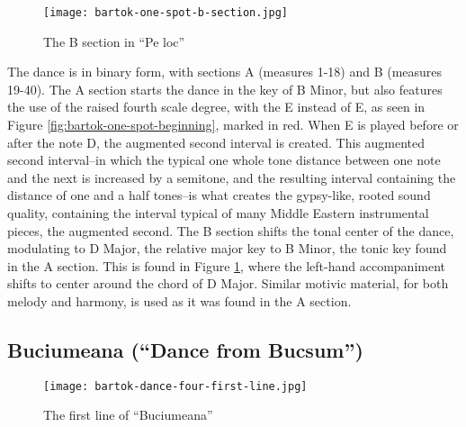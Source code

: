 \begin{figure}
  \centering
  \texttt{[image: bartok-one-spot-b-section.jpg]}
  \caption[The B section of ``Pe loc'', of Bartok's \textit{Romanian Folk Dances, Sz. 56, BB 68}]{The B section in ``Pe loc''}
  \label{fig:bartok-one-spot-b-section}
\end{figure}

The dance is in binary form, with sections A (measures 1-18) and B (measures 19-40). The A section starts the dance in the key of B Minor, but also features the use of the raised fourth scale degree, with the E\musSharp{} instead of E, as seen in Figure \ref{fig:bartok-one-spot-beginning}\autocite{Lung_2016}, marked in red. When E\musSharp{} is played before or after the note D, the augmented second interval is created. This augmented second interval--in which the typical one whole tone distance between one note and the next is increased by a semitone, and the resulting interval containing the distance of one and a half tones--is what creates the gypsy-like, rooted sound quality, containing the interval typical of many Middle Eastern instrumental pieces, the augmented second. The B section shifts the tonal center of the dance, modulating to D Major, the relative major key to B Minor, the tonic key found in the A section. This is found in Figure \ref{fig:bartok-one-spot-b-section}\autocite{Lung_2016}, where the left-hand accompaniment shifts to center around the chord of D Major. Similar motivic material, for both melody and harmony, is used as it was found in the A section.



\subsection{Buciumeana (``Dance from Bucsum'')}

\begin{figure}
  \centering
  \texttt{[image: bartok-dance-four-first-line.jpg]}
  \caption[The first line of ``Buciumeana'' of Bartok's \textit{Romanian Folk Dances}, Sz. 56, BB 68]{The first line of ``Buciumeana''}
  \label{fig:bartok-dance-four-first-line}
\end{figure}


